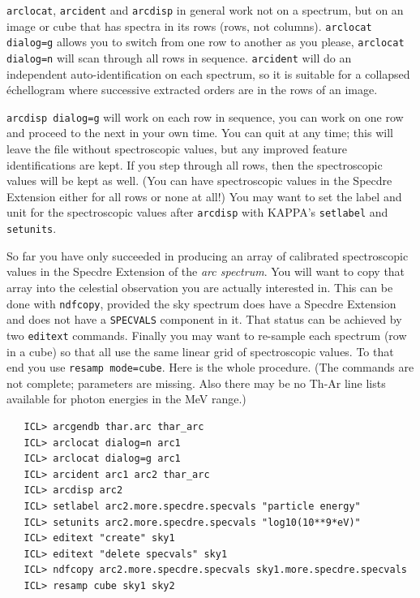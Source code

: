 \documentclass[11pt,twoside]{article}
\newcommand{\htmlref}[2]{#1}
\newcommand{\xref}[3]{#1}
\begin{document}
   {\tt arclocat}, {\tt arcident} and {\tt arcdisp} in general work not on
   a spectrum, but on an image or cube that has spectra in its rows
   (rows, not columns). {\tt arclocat dialog=g} allows you to switch
   from one row to another as you please, {\tt arclocat dialog=n} will
   scan through all rows in sequence.  {\tt arcident} will do an
   independent auto-identification on each spectrum, so it is suitable
   for a collapsed \'echellogram where successive extracted orders are in
   the rows of an image.

   {\tt arcdisp dialog=g} will work on each row in sequence, you
   can work on one row and proceed to the next in your own time.  You
   can quit at any time; this will leave the file without spectroscopic
   values, but any improved feature identifications are kept.  If you
   step through all rows, then the spectroscopic values will be
   kept as well. (You can have spectroscopic values in the Specdre
   Extension either for all rows or none at all!)  You may want to set
   the label and unit for the spectroscopic values after {\tt arcdisp}
   with KAPPA's
{\tt\xref{setlabel}{sun95}{SETLABEL}}
   and
{\tt\xref{setunits}{sun95}{SETUNITS}}.

   So far you have only succeeded in producing an array of calibrated
   spectroscopic values in the Specdre Extension of the {\it arc
   spectrum}. You will want to copy that array into the celestial
   observation you are actually interested in.  This can be done with
{\tt\xref{ndfcopy}{sun95}{NDFCOPY}},
   provided the sky spectrum does have a Specdre Extension and does not
   have a {\tt SPECVALS} component in it.  That status can be achieved
   by two
{\tt\htmlref{editext}{EDITEXT}}
   commands.  Finally you may want to re-sample each spectrum (row in a
   cube) so that all use the same linear grid of spectroscopic
   values. To that end you use
{\tt\htmlref{resamp}{RESAMP} mode=cube}.
   Here is the whole procedure.  (The commands are not complete;
   parameters are missing.  Also there may be no Th-Ar line lists
   available for photon energies in the MeV range.)

\begin{verbatim}
   ICL> arcgendb thar.arc thar_arc
   ICL> arclocat dialog=n arc1
   ICL> arclocat dialog=g arc1
   ICL> arcident arc1 arc2 thar_arc
   ICL> arcdisp arc2
   ICL> setlabel arc2.more.specdre.specvals "particle energy"
   ICL> setunits arc2.more.specdre.specvals "log10(10**9*eV)"
   ICL> editext "create" sky1
   ICL> editext "delete specvals" sky1
   ICL> ndfcopy arc2.more.specdre.specvals sky1.more.specdre.specvals
   ICL> resamp cube sky1 sky2
\end{verbatim}
\end{document}

